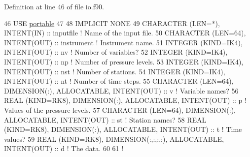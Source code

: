 Definition at line 46 of file io.\+f90.


\begin{DoxyCode}
46     \textcolor{keywordtype}{USE }\hyperlink{namespaceportable}{portable}
47 
48     \textcolor{keywordtype}{IMPLICIT NONE}
49     \textcolor{keywordtype}{CHARACTER (LEN=*)}, \textcolor{keywordtype}{INTENT(IN)}                                       :: inputfile    \textcolor{comment}{! Name of the input
       file.}
50     \textcolor{keywordtype}{CHARACTER (LEN=64)}, \textcolor{keywordtype}{INTENT(OUT)}                                     :: instrument   \textcolor{comment}{! Instrument name.}
51     \textcolor{keywordtype}{INTEGER (KIND=IK4)}, \textcolor{keywordtype}{INTENT(OUT)}                                     :: nv           \textcolor{comment}{! Number of
       variables?}
52     \textcolor{keywordtype}{INTEGER (KIND=IK4)}, \textcolor{keywordtype}{INTENT(OUT)}                                     :: np           \textcolor{comment}{! Number of
       pressure levels.}
53     \textcolor{keywordtype}{INTEGER (KIND=IK4)}, \textcolor{keywordtype}{INTENT(OUT)}                                     :: nst          \textcolor{comment}{! Number of
       stations.}
54     \textcolor{keywordtype}{INTEGER (KIND=IK4)}, \textcolor{keywordtype}{INTENT(OUT)}                                     :: nt           \textcolor{comment}{! Number of time
       steps.}
55     \textcolor{keywordtype}{CHARACTER (LEN=64)}, \textcolor{keywordtype}{DIMENSION(:)}, \textcolor{keywordtype}{ALLOCATABLE}, \textcolor{keywordtype}{INTENT(OUT)}          :: v            \textcolor{comment}{! Variable names?}
56     \textcolor{keywordtype}{REAL (KIND=RK8)}, \textcolor{keywordtype}{DIMENSION(:)}, \textcolor{keywordtype}{ALLOCATABLE}, \textcolor{keywordtype}{INTENT(OUT)}             :: p            \textcolor{comment}{! Values of the
       pressure levels.}
57     \textcolor{keywordtype}{CHARACTER (LEN=64)}, \textcolor{keywordtype}{DIMENSION(:)}, \textcolor{keywordtype}{ALLOCATABLE}, \textcolor{keywordtype}{INTENT(OUT)}          :: st           \textcolor{comment}{! Station names?}
58     \textcolor{keywordtype}{REAL (KIND=RK8)}, \textcolor{keywordtype}{DIMENSION(:)}, \textcolor{keywordtype}{ALLOCATABLE}, \textcolor{keywordtype}{INTENT(OUT)}             :: t            \textcolor{comment}{! Time values?}
59     \textcolor{keywordtype}{REAL (KIND=RK8)}, \textcolor{keywordtype}{DIMENSION(:,:,:,:)}, \textcolor{keywordtype}{ALLOCATABLE}, \textcolor{keywordtype}{INTENT(OUT)}       :: d            \textcolor{comment}{! The data.}
60 
61     \textcolor{comment}{!}

\end{DoxyCode}
